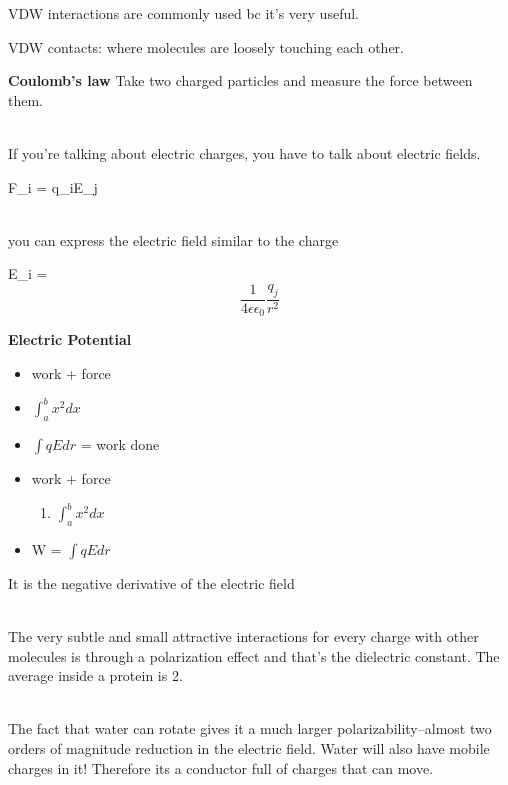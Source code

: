 \documentclass{article}
\begin{document}
VDW interactions are commonly used bc it's very useful. 

VDW contacts: where molecules are loosely touching each other. 

\textbf{Coulomb's law }
    Take two charged particles and measure the force between them. 
    
    \mbox{ }\\
    If you're talking about electric charges, you have to talk about electric fields. 
    
    F_i = q_iE_j 
    
    \mbox{ }\\
    you can express the electric field similar to the charge
    
    E_i = \[\frac{1}{4\epsilon\epsilon_0} \frac{q_j}{r^2}\]
    
    \textbf{Electric Potential}
        
    \begin{itemize}
        \item work + force
        \item $\int_{a}^{b} x^2 dx$
        \item $\int qE dr$ = work done
    \end{itemize}
    
    \begin{itemize}
        \item work + force 
        \begin{enumerate}
            \item $\int_{a}^{b} x^2 dx$
        \end{enumerate}
        \item W = $\int qE dr$ 
    \end{itemize}
            
    It is the negative derivative of the electric field
    
    \mbox{ }\\
    The very subtle and small attractive interactions for every charge with other molecules is through a polarization effect and that's the dielectric constant. The average inside a protein is 2. 
    
    \mbox{ }\\
    The fact that water can rotate gives it a much larger polarizability–almost two orders of magnitude reduction in the electric field. Water will also have mobile charges in it! Therefore its a conductor full of charges that can move. 
        
        
\end{document}
